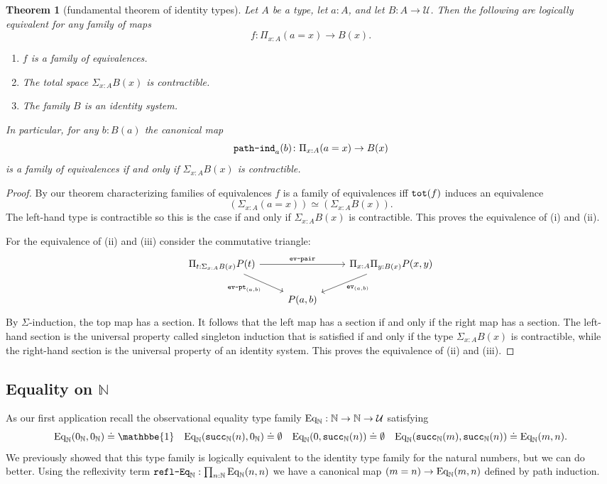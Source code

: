 \documentclass{amsart}
\theoremstyle{theorem}
\newtheorem*{thm}{Theorem}
\theoremstyle{definition}
\theoremstyle{remark}
\newcommand{\0}{\mathbbe{0}}
\newcommand{\1}{\mathbbe{1}}
\newcommand{\2}{\mathbbe{2}}
\newcommand{\3}{\mathbbe{3}}
\newcommand{\4}{\mathbbe{4}}
\newcommand{\term}[1]{{\textup{\texttt{#1}}}}
\newcommand{\bN}{{\mathbb{N}}}
\newcommand{\suc}{\term{succ}_{\bN}}
\newcommand{\UU}{{\mathcal{U}}}
\newcommand{\Eq}{\textup{\text{Eq}}}
\newcommand{\ev}{\term{ev}}
\begin{document}
\begin{thm}[fundamental theorem of identity types] Let $A$ be a type, let $a :A$, and let $B : A \to \UU$. Then the following are logically equivalent for any family of maps \[ f : \Pi_{x:A}(a=x) \to B(x).\]
\begin{enumerate}
\item $f$ is a family of equivalences.
\item The total space $\Sigma_{x:A}B(x)$ is contractible.
\item The family $B$ is an identity system.
\end{enumerate}
In particular, for any $b : B(a)$ the canonical map \[\term{path-ind}_a(b) \colon \Pi_{x:A}(a=x)\to B(x)\] is a family of equivalences if and only if $\Sigma_{x:A}B(x)$ is contractible. 
\end{thm}
\begin{proof}
By our theorem characterizing families of equivalences $f$ is a family of equivalences iff $\term{tot}(f)$ induces an equivalence
\[ \left(\Sigma_{x:A}(a=x) \right) \simeq \left(\Sigma_{x:A}B(x)\right).\]
The left-hand type is contractible so this is the case if and only if $\Sigma_{x:A}B(x)$ is contractible. This proves the equivalence of (i) and (ii). 

For the equivalence of (ii) and (iii) consider the commutative triangle:
\[
\begin{tikzcd} \Pi_{t : \Sigma_{x:A}B(x)} P(t) \arrow[rr, "\term{ev-pair}"] \arrow[dr, "\term{ev-pt}_{(a,b)}"'] & & \Pi_{x:A} \Pi_{y : B(x)} P(x,y) \arrow[dl, "\ev_{(a,b)}"] \\ & P(a,b)
\end{tikzcd}
\]
By $\Sigma$-induction, the top map has a section. It follows that the left map has a section if and only if the right map has a section. The left-hand section is the universal property called singleton induction that is satisfied if and only if the type $\Sigma_{x:A}B(x)$ is contractible, while the right-hand section is the universal property of an identity system. This proves the equivalence of  (ii) and (iii).
\end{proof}

\subsection*{Equality on \texorpdfstring{$\bN$}{N}}

As our first application recall the observational equality type family $\Eq_\bN : \bN \to \bN \to \UU$ satisfying
\[ \Eq_\bN(0_\bN,0_\bN) \doteq \1 \quad \Eq_\bN(\suc(n),0_\bN) \doteq \emptyset \quad \Eq_\bN(0,\suc(n)) \doteq \emptyset \quad \Eq_\bN(\suc(m), \suc(n)) \doteq \Eq_\bN(m,n).\] We previously showed that this type family is logically equivalent to the identity type family for the natural numbers, but we can do better. Using the reflexivity term $\term{refl-Eq}_\bN : \prod_{n :\bN} \Eq_{\bN}(n,n)$ we have a canonical map $(m=n) \to \Eq_\bN(m,n)$ defined by path induction.
\end{document}
